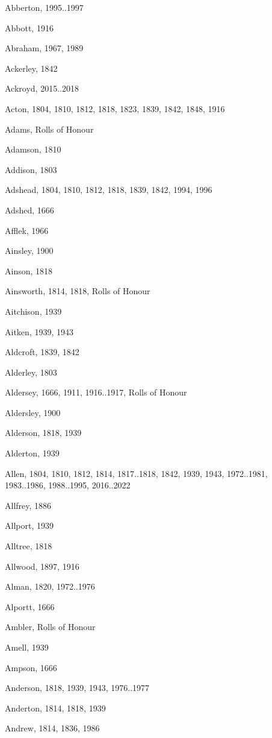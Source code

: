 \renewcommand*{\indexname}{Index of Surnames}
\begin{theindex}
\item Abberton, 1995..1997
\item Abbott, 1916
\item Abraham, 1967, 1989
\item Ackerley, 1842
\item Ackroyd, 2015..2018
\item Acton, 1804, 1810, 1812, 1818, 1823, 1839, 1842, 1848, 1916
\item Adams, Rolls of Honour
\item Adamson, 1810
\item Addison, 1803
\item Adshead, 1804, 1810, 1812, 1818, 1839, 1842, 1994, 1996
\item Adshed, 1666
\item Afflek, 1966
\item Ainsley, 1900
\item Ainson, 1818
\item Ainsworth, 1814, 1818, Rolls of Honour
\item Aitchison, 1939
\item Aitken, 1939, 1943
\item Aldcroft, 1839, 1842
\item Alderley, 1803
\item Aldersey, 1666, 1911, 1916..1917, Rolls of Honour
\item Aldersley, 1900
\item Alderson, 1818, 1939
\item Alderton, 1939
\item Allen, 1804, 1810, 1812, 1814, 1817..1818, 1842, 1939, 1943, 1972..1981, 1983..1986, 1988..1995, 2016..2022
\item Allfrey, 1886
\item Allport, 1939
\item Alltree, 1818
\item Allwood, 1897, 1916
\item Alman, 1820, 1972..1976
\item Alportt, 1666
\item Ambler, Rolls of Honour
\item Amell, 1939
\item Ampson, 1666
\item Anderson, 1818, 1939, 1943, 1976..1977
\item Anderton, 1814, 1818, 1939
\item Andrew, 1814, 1836, 1986

\end{theindex}
